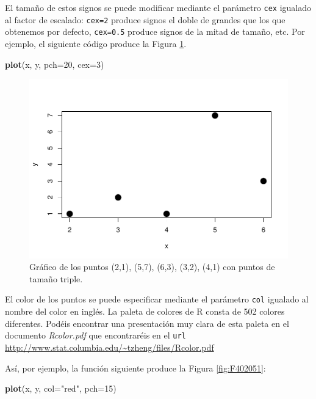 \documentclass[
]{book}
\newenvironment{Shaded}{\begin{snugshade}}{\end{snugshade}}
\newcommand{\DataTypeTok}[1]{\textcolor[rgb]{0.13,0.29,0.53}{#1}}
\newcommand{\DecValTok}[1]{\textcolor[rgb]{0.00,0.00,0.81}{#1}}
\newcommand{\KeywordTok}[1]{\textcolor[rgb]{0.13,0.29,0.53}{\textbf{#1}}}
\newcommand{\NormalTok}[1]{#1}
\newcommand{\StringTok}[1]{\textcolor[rgb]{0.31,0.60,0.02}{#1}}
\theoremstyle{definition}
\theoremstyle{definition}
\theoremstyle{definition}
\theoremstyle{remark}
\begin{document}
El tamaño de estos signos se puede modificar mediante el parámetro \texttt{cex} igualado al factor de escalado: \texttt{cex=2} produce signos el doble de grandes que los que obtenemos por defecto, \texttt{cex=0.5} produce signos de la mitad de tamaño, etc. Por ejemplo, el siguiente código produce la Figura \ref{fig:cex}.

\begin{Shaded}
\begin{Highlighting}[]
\KeywordTok{plot}\NormalTok{(x, y, }\DataTypeTok{pch=}\DecValTok{20}\NormalTok{, }\DataTypeTok{cex=}\DecValTok{3}\NormalTok{)}
\end{Highlighting}
\end{Shaded}

\begin{figure}

{\centering \includegraphics[width=0.9\linewidth]{07chap06_Graficos_I_files/figure-latex/cex-1} 

}

\caption{Gráfico de los puntos (2,1), (5,7), (6,3), (3,2), (4,1) con puntos de tamaño triple.}\label{fig:cex}
\end{figure}

El color de los puntos se puede especificar mediante el parámetro \texttt{col} igualado al nombre del color en inglés. La paleta de colores de R consta de 502 colores diferentes. Podéis encontrar una presentación muy clara de esta paleta en el documento \emph{Rcolor.pdf} que encontraréis en el \texttt{url} \url{http://www.stat.columbia.edu/~tzheng/files/Rcolor.pdf}

Así, por ejemplo, la función siguiente produce la Figura \ref{fig:F402051}:

\begin{Shaded}
\begin{Highlighting}[]
\KeywordTok{plot}\NormalTok{(x, y, }\DataTypeTok{col=}\StringTok{"red"}\NormalTok{, }\DataTypeTok{pch=}\DecValTok{15}\NormalTok{)}
\end{Highlighting}
\end{Shaded}
\end{document}
